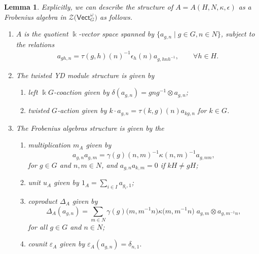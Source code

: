 \documentclass[10pt,a4paper]{amsart}
\numberwithin{equation}{section}
\newtheorem{Lemma}[Theorem]{Lemma}
\newcommand{\Vect}{\mathsf{Vect}}
\newcommand{\cZ}{\mathcal{Z}}
\begin{document}
\begin{Lemma}\label{lem:AFrobenius}
 Explicitly, we can describe the structure of $A=A(H,N,\kappa,\epsilon)$ as a Frobenius algebra in $\cZ\big(\Vect_G^\omega\big)$ as follows.
\begin{enumerate}\itemsep=0pt
 \item[$(a)$] $A$ is the quotient $\Bbbk$-vector space spanned by $\{ a_{g,n} \mid g \in G, n\in N\}$, subject to the relations
 \begin{align}
 a_{gh,n}=\tau(g,h)(n)^{-1}\epsilon_h(n)a_{g,hnh^{-1}}, \qquad \forall h\in H.\label{eq:Davquotrel}
\end{align}
\item[$(b)$] The twisted YD module structure is given by
 \begin{enumerate}\itemsep=0pt
 \item[$(i)$] left $\Bbbk G$-coaction given by $\delta(a_{g,n})=g ng^{-1}\otimes a_{g,n}$;
 \item[$(ii)$] twisted $G$-action given by $k\cdot a_{g,n}=\tau(k,g)(n)a_{kg,n}$ for $k\in G$.
 \end{enumerate}
\item[$(c)$] The Frobenius algebras structure is given by the
 \begin{enumerate}
 \item[$(iii)$] multiplication $m_A$ given by \[a_{g,n}a_{g,m}=\gamma(g)(n,m)^{-1}\kappa(n,m)^{-1}a_{g,nm},
 \] for $g\in G$ and $n,m\in N$, and $a_{g,n}a_{k,m}=0$ if $kH\neq gH$;
 \item[$(iv)$] unit $u_A$ given by $1_A =\sum\limits_{i\in I}a_{g_i,1}$;
 \item[$(v)$] coproduct $\Delta_A$ given by
 \[\Delta_A(a_{g,n}) = \sum_{m\in N}\gamma(g)\big(m,m^{-1}n\big)\kappa\big(m,m^{-1}n\big) \;a_{g,m}\otimes a_{g,m^{-1}n},\]
 for all $g\in G$ and $n\in N$;
 \item[$(vi)$] counit $\varepsilon_A$ given by
 $\varepsilon_A(a_{g,n}) = \delta_{n,1}.$
 \end{enumerate}
\end{enumerate}
\end{Lemma}
\end{document}
